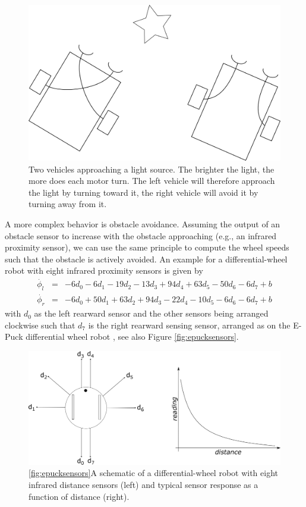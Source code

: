 \begin{figure}
\centering
\includegraphics[width=0.7\columnwidth]{figs/braitenberg.png}
\caption{Two vehicles approaching a light source. The brighter the light, the more does each motor turn. The left vehicle will therefore approach the light by turning toward it, the right vehicle will avoid it by turning away from it.\label{fig:braitenberg}}
\end{figure}

A more complex behavior is obstacle avoidance. Assuming the output of an obstacle sensor to increase with the obstacle approaching (e.g., an infrared proximity sensor), we can use the same principle to compute the wheel speeds such that the obstacle is actively avoided. An example for a differential-wheel robot with eight infrared proximity sensors is given by
\begin{eqnarray}
\nonumber
\dot{\phi_l}&=&-6d_0-6d_1-19d_2-13d_3+94d_4+63d_5-50d_6-6d_7+b\\
\nonumber
\dot{\phi_r}&=&-6d_0+50d_1+63d_2+94d_3-22d_4-10d_5-6d_6-6d_7+b
\end{eqnarray}
%
%
with $d_0$ as the left rearward sensor and the other sensors being arranged clockwise such that $d_7$ is the right rearward sensing sensor, arranged as on the E-Puck differential wheel robot \cite{mondada2009puck}, see also Figure \ref{fig:epucksensors}.

\begin{figure}
\centering
\includegraphics[width=0.9\columnwidth]{figs/ePuck.png}
\caption{\ref{fig:epucksensors}A schematic of a differential-wheel robot with eight infrared distance sensors (left) and typical sensor response as a function of distance (right).}
\end{figure}

